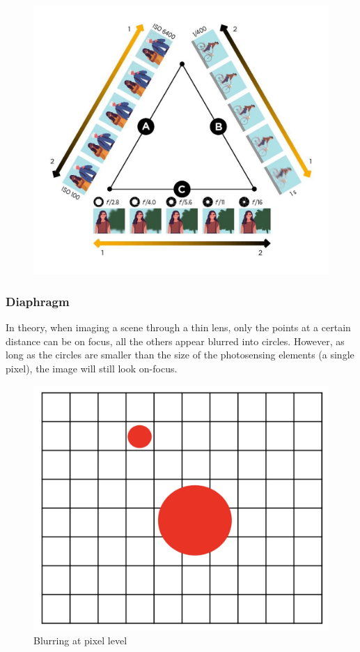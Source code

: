 \begin{figure}[htbp]
  \centering
  \includegraphics[width=0.8\linewidth]{./img/tradeoffs.jpg}
  \label{fig:tradeoffs}
\end{figure}

\subsubsection{Diaphragm}

In theory, when imaging a scene through a thin lens, only the points at a certain distance can be on focus, all the others appear blurred into circles.
However, as long as the circles are smaller than the size of the photosensing elements (a single pixel), the image will still look on-focus.

\begin{figure}[htbp]
  \centering
  \includegraphics[width=0.55\linewidth]{./img/diaphragm.jpg}
  \caption{Blurring at pixel level}
  \label{fig:diaphragm}
\end{figure}

